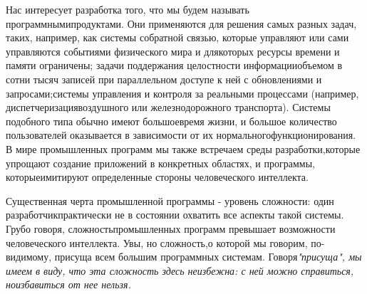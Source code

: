 \documentclass[10pt]{article}
\begin{document}
Нас интересует разработка того, что мы будем называть  программными\linebreak  продуктами\rm. Они применяются для решения самых разных задач, таких, например, как системы с\linebreak  обратной связью, которые управляют или сами управляются событиями физического мира и для\linebreak  которых ресурсы времени и памяти ограничены; задачи поддержания целостности информации\linebreak  объемом в сотни тысяч записей при параллельном доступе к ней с обновлениями и запросами;\linebreak  системы управления и контроля за реальными процессами (например, диспетчеризация\linebreak  воздушного или железнодорожного транспорта). Системы подобного типа обычно имеют большое\linebreak  время жизни, и большое количество пользователей оказывается в зависимости от их нормального\linebreak  функционирования. В мире промышленных программ мы также встречаем среды разработки,\linebreak  которые упрощают создание приложений в конкретных областях, и программы, которые\linebreak  имитируют определенные стороны человеческого интеллекта. \vspace{3mm}

Существенная черта промышленной программы - уровень сложности: один разработчик\linebreak  практически не в состоянии охватить все аспекты такой системы. Грубо говоря, сложность\linebreak  промышленных программ превышает возможности человеческого интеллекта. Увы, но сложность,\linebreak  о которой мы говорим, по-видимому, присуща всем большим программных системам. Говоря\linebreak \it "присуща"\rm, мы имеем в виду, что эта сложность здесь неизбежна: с ней можно справиться, но\linebreak  избавиться от нее нельзя. \vspace{3mm}
\end{document}
